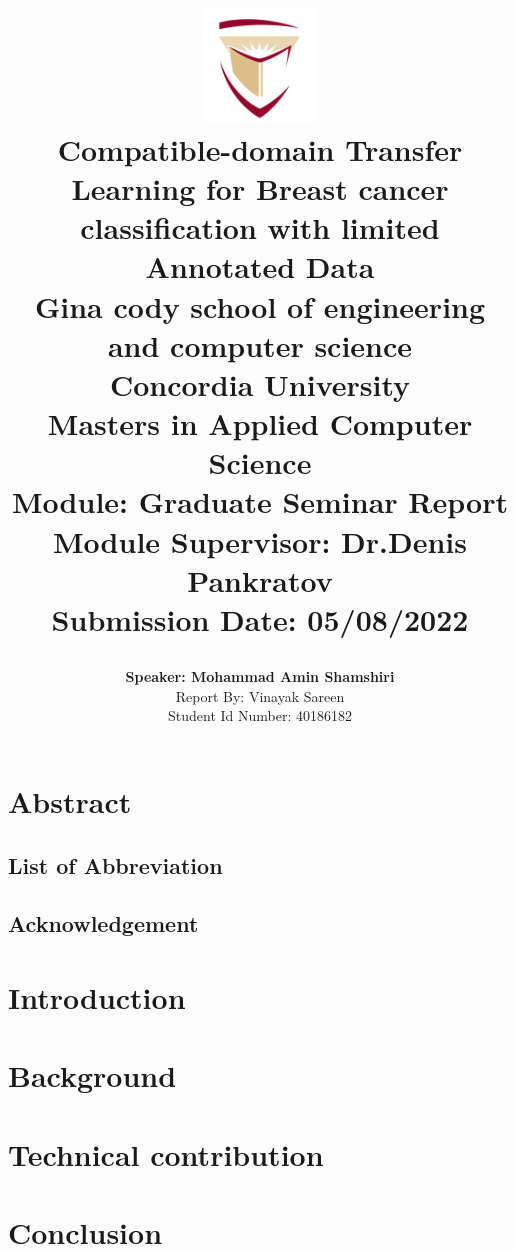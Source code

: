 \documentclass[]{report}
\title{
	\begin{center}
	\includegraphics[width=3cm]{assets/concordia-logo.png} \\
	\vspace{2mm}
	{Compatible-domain Transfer Learning for Breast cancer classification with limited Annotated Data} \\
	\vspace{5mm} %
	\large {
		{Gina cody school of engineering and computer science}\\
		{Concordia University}\\
	}
	\vspace{3mm} %
	\textbf{ Masters in Applied Computer Science}\\
	{\large Module: Graduate Seminar Report}\\
	{\large Module Supervisor: Dr.Denis Pankratov}\\
	{\large Submission Date: 05/08/2022} \\
	\end{center}
}
\author{
	{\textbf{Speaker: Mohammad Amin Shamshiri}}\\
	{\large Report By:  Vinayak Sareen} \\
	{\large Student Id Number:  40186182} \\
}
\date{}
\begin{document}
\maketitle

\chapter*{Abstract}


\pagebreak
\section*{List of Abbreviation}


\section*{Acknowledgement}


\tableofcontents
\onehalfspacing
\chapter{Introduction}


\chapter{Background}


\chapter{Technical contribution}



\chapter{Conclusion}





\pagebreak
\thispagestyle{plain}
\end{document}

